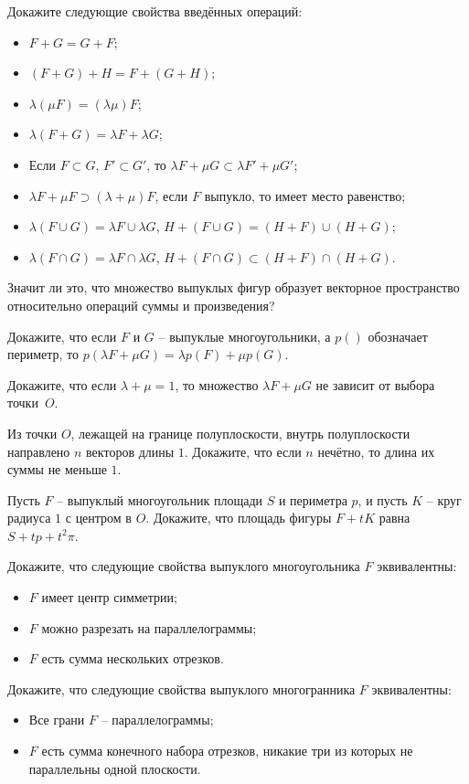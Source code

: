 \documentclass[a4paper,12pt]{article}
\begin{document}
 Докажите следующие свойства введённых операций:
 \begin{itemize}
  \item $F+G=G+F$;
  \item $(F+G)+H=F+(G+H)$;
  \item $\lambda (\mu F) = (\lambda \mu)F$;
  \item $\lambda(F+G)=\lambda F + \lambda G$;
  \item Если $F \subset G$, $F' \subset G'$, то $\lambda F + \mu G \subset \lambda F' + \mu G'$;
  \item $\lambda F + \mu F \supset (\lambda + \mu)F$, если $F$ выпукло, то имеет место равенство;
  \item $\lambda (F \cup G) = \lambda F \cup \lambda G$, $H+(F \cup G) = (H+F) \cup (H+G)$;
  \item $\lambda (F \cap G) = \lambda F \cap \lambda G$, $H+(F \cap G) \subset (H+F) \cap (H+G)$.
 \end{itemize}
 Значит ли это, что множество выпуклых фигур образует векторное пространство относительно операций суммы и произведения?

 Докажите, что если $F$ и $G$ -- выпуклые многоугольники, а $p()$ обозначает периметр, то $p(\lambda F + \mu G) = \lambda p(F)+\mu p(G)$.

 Докажите, что если $\lambda+\mu=1$, то множество $\lambda F+\mu G$ не зависит от выбора точки~$O$.

 Из точки $O$, лежащей на границе полуплоскости, внутрь полуплоскости направлено $n$ векторов длины $1$. Докажите, что если $n$ нечётно, то длина их суммы не меньше $1$.

 Пусть $F$ -- выпуклый многоугольник площади $S$ и периметра $p$, и пусть $K$ -- круг радиуса $1$ с центром в $O$. Докажите, что площадь фигуры $F+tK$ равна $S+tp+t^2\pi$.

 Докажите, что следующие свойства выпуклого многоугольника $F$ эквивалентны:
 \begin{itemize}
  \item $F$ имеет центр симметрии;
  \item $F$ можно разрезать на параллелограммы;
  \item $F$ есть сумма нескольких отрезков.
 \end{itemize}

  Докажите, что следующие свойства выпуклого многогранника $F$ эквивалентны:
 \begin{itemize}
  \item Все грани $F$ -- параллелограммы;
  \item $F$ есть сумма конечного набора отрезков, никакие три из которых не параллельны одной плоскости.
 \end{itemize}
\end{document}

